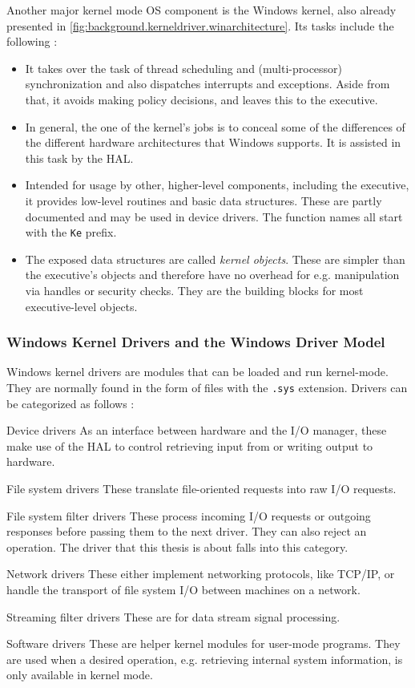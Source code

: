 Another major kernel mode OS component is the Windows kernel, also already presented in \autoref{fig:background.kerneldriver.winarchitecture}. Its tasks include the following \cite{Yosifovich2017}:
\begin{itemize}
	\item It takes over the task of thread scheduling and (multi-processor) synchronization and also dispatches interrupts and exceptions. Aside from that, it avoids making policy decisions, and leaves this to the executive.
	\item In general, the one of the kernel's jobs is to conceal some of the differences of the different hardware architectures that Windows supports. It is assisted in this task by the HAL.
	\item Intended for usage by other, higher-level components, including the executive, it provides low-level routines and basic data structures. These are partly documented and may be used in device drivers. The function names all start with the \texttt{Ke} prefix.
	\item The exposed data structures are called \emph{kernel objects}. These are simpler than the executive's objects and therefore have no overhead for e.g. manipulation via handles or security checks. They are the building blocks for most executive-level objects.
\end{itemize}

\subsubsection{Windows Kernel Drivers and the Windows Driver Model}
\label{chap:background.kerneldriver.wdm}
Windows kernel drivers are modules that can be loaded and run kernel-mode. They are normally found in the form of files with the \texttt{.sys} extension. Drivers can be categorized as follows \cite{Yosifovich2017}:
\begin{descitemize}
	\item[Device drivers] As an interface between hardware and the I/O manager, these make use of the HAL to control retrieving input from or writing output to hardware.
	\item[File system drivers] These translate file-oriented requests into raw I/O requests.
	\item[File system filter drivers] These process incoming I/O requests or outgoing responses before passing them to the next driver. They can also reject an operation. The driver that this thesis is about falls into this category.
	\item[Network drivers] These either implement networking protocols, like TCP/IP, or handle the transport of file system I/O between machines on a network.
	\item[Streaming filter drivers] These are for data stream signal processing.
	\item[Software drivers] These are helper kernel modules for user-mode programs. They are used when a desired operation, e.g. retrieving internal system information, is only available in kernel mode.
\end{descitemize}

